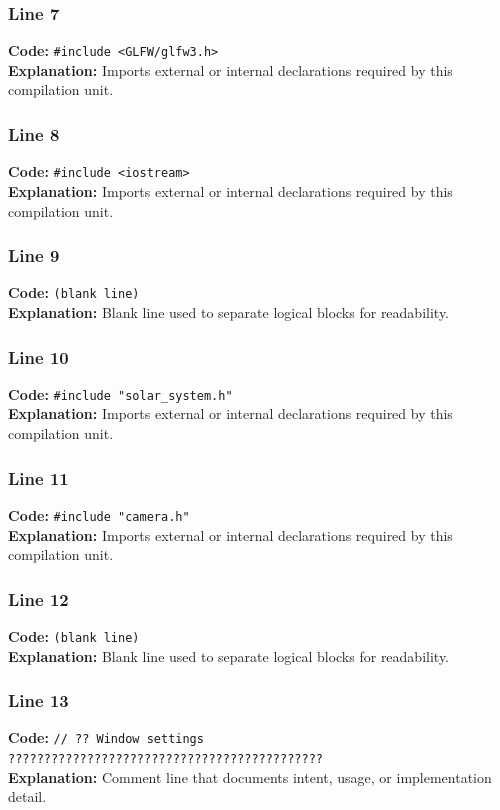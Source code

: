 \documentclass[11pt,a4paper]{article}
\begin{document}
\subsubsection*{Line 7}
\textbf{Code:} \verb|#include <GLFW/glfw3.h>|\\
\textbf{Explanation:} Imports external or internal declarations required by this compilation unit.

\subsubsection*{Line 8}
\textbf{Code:} \verb|#include <iostream>|\\
\textbf{Explanation:} Imports external or internal declarations required by this compilation unit.

\subsubsection*{Line 9}
\textbf{Code:} \texttt{(blank line)}\\
\textbf{Explanation:} Blank line used to separate logical blocks for readability.

\subsubsection*{Line 10}
\textbf{Code:} \verb|#include "solar_system.h"|\\
\textbf{Explanation:} Imports external or internal declarations required by this compilation unit.

\subsubsection*{Line 11}
\textbf{Code:} \verb|#include "camera.h"|\\
\textbf{Explanation:} Imports external or internal declarations required by this compilation unit.

\subsubsection*{Line 12}
\textbf{Code:} \texttt{(blank line)}\\
\textbf{Explanation:} Blank line used to separate logical blocks for readability.

\subsubsection*{Line 13}
\textbf{Code:} \verb|// ?? Window settings ????????????????????????????????????????????|\\
\textbf{Explanation:} Comment line that documents intent, usage, or implementation detail.
\end{document}
